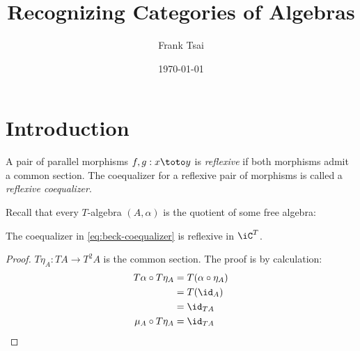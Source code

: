 \documentclass{amsart}
\title{Recognizing Categories of Algebras}
\author{Frank Tsai}
\date{\today}
\begin{document}
\maketitle
\tableofcontents

\section{Introduction}
\label{sec:introduction}

\begin{defn}
  A pair of parallel morphisms $f,g : x \toto y$ is \emph{reflexive} if both morphisms admit a common section.
  The coequalizer for a reflexive pair of morphisms is called a \emph{reflexive coequalizer}.
\end{defn}

Recall that every $T$-algebra $(A,\alpha)$ is the quotient of some free algebra:
\begin{equation}
  \label{eq:beck-coequalizer}
  
\end{equation}

\begin{lem}
  The coequalizer in \eqref{eq:beck-coequalizer} is reflexive in $\iC^{T}$.
\end{lem}
\begin{proof}
  $T\eta_{A} : TA \to T^{2}A$ is the common section.
  The proof is by calculation:
  \begin{align}
    T\alpha \circ T\eta_{A} &= T(\alpha \circ \eta_{A})\\
                &= T(\id_{A})\\
                &= \id_{TA}\\
    \mu_{A} \circ T\eta_{A} &= \id_{TA}
  \end{align}
\end{proof}
\end{document}
